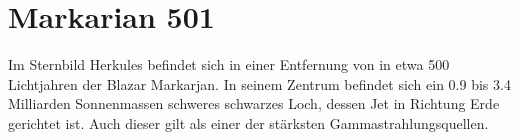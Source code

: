 \section{Markarian 501}
Im Sternbild Herkules befindet sich in einer Entfernung von in etwa 500 Lichtjahren der Blazar Markarjan. 
In seinem Zentrum befindet sich ein \num{0.9} bis \num{3.4} Milliarden Sonnenmassen schweres schwarzes Loch, dessen Jet in Richtung Erde gerichtet ist.
Auch dieser gilt als einer der stärksten Gammastrahlungsquellen.
